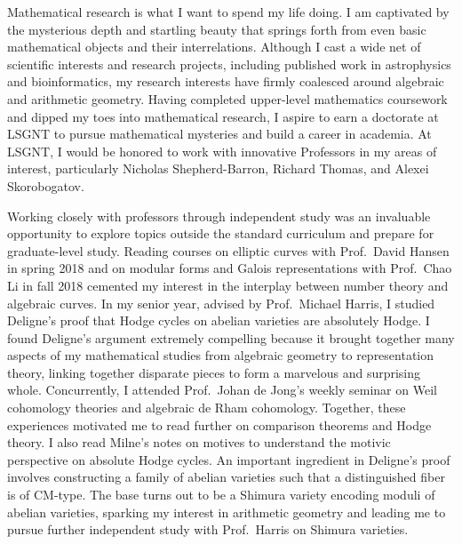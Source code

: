 \documentclass[11pt]{article}
\begin{document}
Mathematical research is what I want to spend my life doing. I am captivated by the mysterious depth and startling beauty that springs forth from even basic mathematical objects and their interrelations. Although I cast a wide net of scientific interests and research projects, including published work in astrophysics and bioinformatics, my research interests have firmly coalesced around algebraic and arithmetic geometry. Having completed upper-level mathematics coursework and dipped my toes into mathematical research, I aspire to earn a doctorate at LSGNT to pursue mathematical mysteries and build a career in academia. At LSGNT, I would be honored to work with innovative Professors in my areas of interest, particularly Nicholas Shepherd-Barron, Richard Thomas, and Alexei Skorobogatov.
\par
Working closely with professors through independent study was an invaluable opportunity to explore topics outside the standard curriculum and prepare for graduate-level study. 
Reading courses on elliptic curves with Prof.\ David Hansen in spring 2018 and on modular forms and Galois representations with Prof.\ Chao Li in fall 2018 cemented my interest in the interplay between number theory and algebraic curves. In my senior year, advised by Prof.\ Michael Harris, I studied Deligne's proof that Hodge cycles on abelian varieties are absolutely Hodge. I found Deligne's argument extremely compelling because it brought together many aspects of my mathematical studies from algebraic geometry to representation theory, linking together disparate pieces to form a marvelous and surprising whole. Concurrently, I attended Prof.\ Johan de Jong's weekly seminar on Weil cohomology theories and algebraic de Rham cohomology. Together, these experiences motivated me to read further on comparison theorems and Hodge theory. I also read Milne's notes on motives to understand the motivic perspective on absolute Hodge cycles. An important ingredient in Deligne's proof involves constructing a family of abelian varieties such that a distinguished fiber is of CM-type. The base turns out to be a Shimura variety encoding moduli of abelian varieties, sparking my interest in arithmetic geometry and leading me to pursue further independent study with Prof.\ Harris on Shimura varieties.
\par
\end{document}
